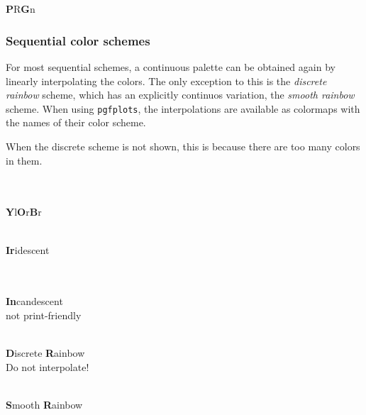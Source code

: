 \documentclass{scrartcl}
\begin{document}
\begin{center}
    \\
    \\
    \textbf{P}R\textbf{G}n
\end{center}\clearpage

\subsubsection{Sequential color schemes}\label{sec:T-S}
For most sequential schemes, a continuous palette can be obtained again by linearly interpolating the colors.
The only exception to this is the \emph{discrete rainbow} scheme, which has an explicitly continuos variation, the \emph{smooth rainbow} scheme.
When using \verb!pgfplots!, the interpolations are available as colormaps with the names of their color scheme.

When the discrete scheme is not shown, this is because there are too many colors in them.

\begin{center}
    \\
    \\
    \textbf{Y}l\textbf{O}r\textbf{B}r
\end{center}

\begin{center}
    \\
    \textbf{Ir}idescent
\end{center}

\begin{center}
    \\
    \\
    \textbf{In}candescent\\
    not print-friendly
\end{center}

\begin{center}
    \\
    \textbf{D}iscrete \textbf{R}ainbow\\
    Do not interpolate!
\end{center}

\begin{center}
    \\
    \textbf{S}mooth \textbf{R}ainbow\\
\end{center}\clearpage
\end{document}
